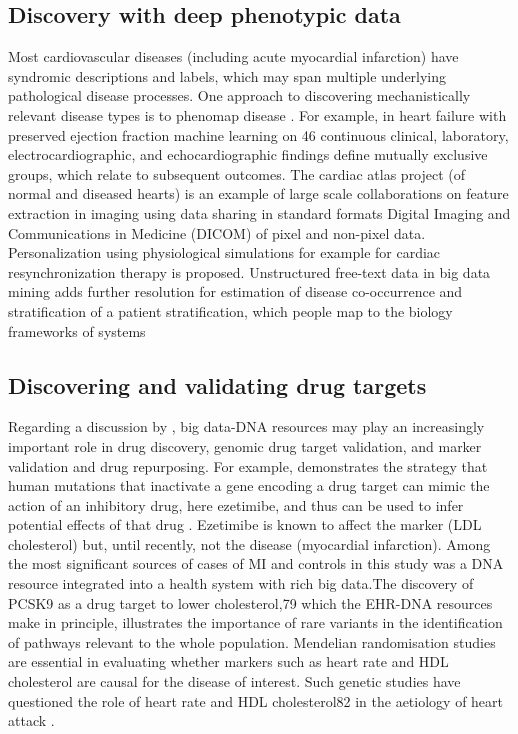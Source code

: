 \documentclass[sigconf]{acmart}
\begin{document}
\subsection{Discovery with deep phenotypic data}
Most cardiovascular diseases (including acute myocardial infarction) have syndromic descriptions and labels, which may span multiple underlying pathological disease processes. One approach to discovering mechanistically relevant disease types is to phenomap disease \cite{rajkumar2010diagnosis}. For example, in heart failure with preserved ejection fraction machine learning on 46 continuous clinical, laboratory, electrocardiographic, and echocardiographic findings define mutually exclusive groups, which relate to subsequent outcomes. The cardiac atlas project (of normal and diseased hearts) is an example of large scale collaborations on feature extraction in imaging using data sharing in standard formats Digital Imaging and Communications in Medicine (DICOM) of pixel and non-pixel data. Personalization using physiological simulations for example for cardiac resynchronization therapy is proposed. Unstructured free-text data in big data mining adds further resolution for estimation of disease co-occurrence and stratification of a patient stratification, which people map to the biology frameworks of systems \cite{rajkumar2010diagnosis}

\subsection{Discovering and validating drug targets}
Regarding a discussion by \cite{rajkumar2010diagnosis}, big data-DNA resources may play an increasingly important role in drug discovery, genomic drug target validation, and marker validation and drug repurposing. For example, demonstrates the strategy that human mutations that inactivate a gene encoding a drug target can mimic the action of an inhibitory drug, here ezetimibe, and thus can be used to infer potential effects of that drug \cite{rajkumar2010diagnosis}.  Ezetimibe is known to affect the marker (LDL cholesterol) but, until recently, not the disease (myocardial infarction). 
Among the most significant sources of cases of MI and controls in this study was a DNA resource integrated into a health system with rich big data.The discovery of PCSK9 as a drug target to lower cholesterol,79 which the EHR-DNA resources make in principle, illustrates the importance of rare variants in the identification of pathways relevant to the whole population. Mendelian randomisation studies are essential in evaluating whether markers such as heart rate and HDL cholesterol are causal for the disease of interest. Such genetic studies have questioned the role of heart rate and HDL cholesterol82 in the aetiology of heart attack \citep{palaniappan2008intelligent}.
\end{document}
